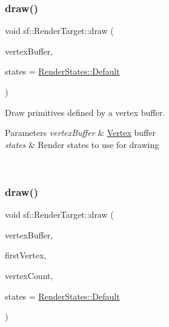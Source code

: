 \subsubsection{\texorpdfstring{draw()}{draw()}\hspace{0.1cm}{\footnotesize\ttfamily [3/4]}}
{\footnotesize\ttfamily void sf\+::\+Render\+Target\+::draw (\begin{DoxyParamCaption}\item[{const \mbox{\hyperlink{classsf_1_1_vertex_buffer}{Vertex\+Buffer}} \&}]{vertex\+Buffer,  }\item[{const \mbox{\hyperlink{classsf_1_1_render_states}{Render\+States}} \&}]{states = {\ttfamily \mbox{\hyperlink{classsf_1_1_render_states_ad29672df29f19ce50c3021d95f2bb062}{Render\+States\+::\+Default}}} }\end{DoxyParamCaption})}



Draw primitives defined by a vertex buffer. 


\begin{DoxyParams}{Parameters}
{\em vertex\+Buffer} & \mbox{\hyperlink{classsf_1_1_vertex}{Vertex}} buffer \\
\hline
{\em states} & Render states to use for drawing \begin{DoxyVerb}\end{DoxyVerb}
 \\
\hline
\end{DoxyParams}
\mbox{\label{classsf_1_1_render_target_a07cb25d4557a30146b24b25b242310ea}} 
\subsubsection{\texorpdfstring{draw()}{draw()}\hspace{0.1cm}{\footnotesize\ttfamily [4/4]}}
{\footnotesize\ttfamily void sf\+::\+Render\+Target\+::draw (\begin{DoxyParamCaption}\item[{const \mbox{\hyperlink{classsf_1_1_vertex_buffer}{Vertex\+Buffer}} \&}]{vertex\+Buffer,  }\item[{std\+::size\+\_\+t}]{first\+Vertex,  }\item[{std\+::size\+\_\+t}]{vertex\+Count,  }\item[{const \mbox{\hyperlink{classsf_1_1_render_states}{Render\+States}} \&}]{states = {\ttfamily \mbox{\hyperlink{classsf_1_1_render_states_ad29672df29f19ce50c3021d95f2bb062}{Render\+States\+::\+Default}}} }\end{DoxyParamCaption})}



